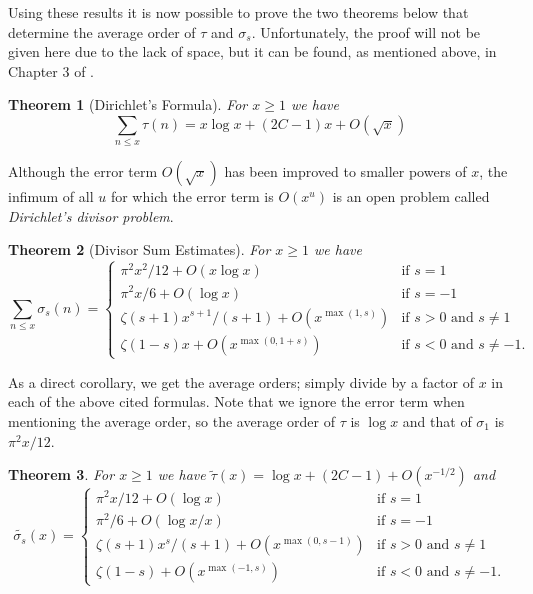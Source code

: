 \documentclass{article}
\newtheorem{theorem}{Theorem}
\theoremstyle{definition}
\begin{document}
Using these results it is now possible to prove the two theorems below that determine the average order of \(\tau\) and \(\sigma_s\).
Unfortunately, the proof will not be given here due to the lack of space, but it can be found, as mentioned above, in Chapter 3 of \cite{Apostol1976}.

\begin{theorem}[Dirichlet's Formula]\label{theorem:tau}
    For \(x\ge 1\) we have
    \[\sum_{n\le x} \tau(n) = x\log x + (2C-1)x + O(\sqrt x)\]
\end{theorem}

Although the error term \(O(\sqrt x)\) has been improved to smaller powers of \(x\), the infimum of all \(u\) for which the error term is \(O(x^u)\) is an open problem called \textit{Dirichlet's divisor problem}.

\begin{theorem}[Divisor Sum Estimates]\label{theorem:sigma}
    For \(x\ge 1\) we have
    \[
        \sum_{n\le x} \sigma_s(n) =
        \begin{cases}
            \pi^2x^2/12 + O(x\log x) & \text{if } s=1 \\
            \pi^2x/6 + O(\log x) & \text{if } s=-1 \\
            \zeta(s+1)x^{s+1}/(s+1) + O(x^{\max(1,s)}) & \text{if } s>0 \text{ and } s\ne 1 \\
            \zeta(1-s)x + O(x^{\max(0,1+s)}) & \text{if } s<0 \text{ and } s\ne -1.
        \end{cases}
    \]
\end{theorem}

As a direct corollary, we get the average orders; simply divide by a factor of \(x\) in each of the above cited formulas.
Note that we ignore the error term when mentioning the average order, so the average order of \(\tau\) is \(\log x\) and that of \(\sigma_1\) is \(\pi^2x/12\).

\begin{theorem}
    For \(x\ge 1\) we have \(\tilde{\tau}(x) = \log x + (2C-1) + O(x^{-1/2})\) and
    \[
        \tilde{\sigma_s}(x) =
        \begin{cases}
            \pi^2x/12 + O(\log x) & \text{if } s=1 \\
            \pi^2/6 + O(\log x/x) & \text{if } s=-1 \\
            \zeta(s+1)x^s/(s+1) + O(x^{\max(0,s-1)}) & \text{if } s>0 \text{ and } s\ne 1 \\
            \zeta(1-s) + O(x^{\max(-1,s)}) & \text{if } s<0 \text{ and } s\ne -1.
        \end{cases}
    \]
\end{theorem}
\end{document}
